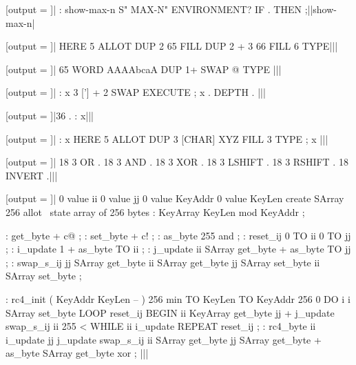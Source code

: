 [output = \result]|
  : show-max-n S" MAX-N" ENVIRONMENT? IF . THEN ;||show-max-n|
\typeout{\result}

[output = \result]|
  HERE 5 ALLOT
  DUP 2 65 FILL
  DUP 2 + 3 66 FILL
  6 TYPE|||
\typeout{\result}

[output = \result]|
  65 WORD AAAAbcaA DUP 1+ SWAP @ TYPE
|||
\typeout{\result}

[output = \result]|
  : x 3 ['] + 2 SWAP EXECUTE ; x . DEPTH .
|||
\typeout{\result}

[output = \result]|36 . : x|||
\typeout{\result}

[output = \result]|
  : x HERE 5 ALLOT DUP 3 [CHAR] XYZ FILL 3 TYPE ; x |||
\typeout{\result}

[output = \result]|
  18 3 OR .
  18 3 AND .
  18 3 XOR .
  18 3 LSHIFT .
  18 3 RSHIFT .
  18 INVERT .|||
\typeout{\result}

\stop

[output = \result]|
  0 value ii        0 value jj
  0 value KeyAddr   0 value KeyLen
  create SArray   256 allot   \ state array of 256 bytes
  : KeyArray      KeyLen mod   KeyAddr ;

  : get_byte      + c@ ;
  : set_byte      + c! ;
  : as_byte       255 and ;
  : reset_ij      0 TO ii   0 TO jj ;
  : i_update      1 +   as_byte TO ii ;
  : j_update      ii SArray get_byte +   as_byte TO jj ;
  : swap_s_ij
      jj SArray get_byte
         ii SArray get_byte  jj SArray set_byte
      ii SArray set_byte
  ;

  : rc4_init ( KeyAddr KeyLen -- )
      256 min TO KeyLen   TO KeyAddr
      256 0 DO   i i SArray set_byte   LOOP
      reset_ij
      BEGIN
          ii KeyArray get_byte   jj +  j_update
          swap_s_ij
          ii 255 < WHILE
          ii i_update
      REPEAT
      reset_ij
  ;
  : rc4_byte
      ii i_update   jj j_update
      swap_s_ij
      ii SArray get_byte   jj SArray get_byte +   as_byte SArray get_byte  xor
  ;
|||
\typeout{\result}

\stop